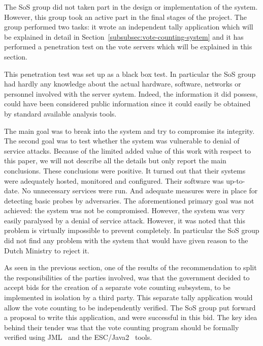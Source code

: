 \documentclass[times, 10pt, twocolumn]{article}
\begin{document}
The SoS group did not taken part in the design or implementation of the system. 
However, this group took an active part in the final stages of the project. The 
group performed two tasks: it wrote an independent tally application which will 
be explained in detail in Section~\ref{subsubsec:vote-counting-system} and it 
has performed a penetration test on the vote servers which will be explained in 
this section.

This penetration test was set up as a black box test.  In particular
the SoS group had hardly any knowledge about the actual hardware,
software, networks or personnel involved with the server system.  
Indeed, the information it did possess, could have been considered public
information since it could easily be obtained by standard available analysis
tools.

The main goal was to break into the system and try to compromise its integrity. 
The second goal was to test whether the system was vulnerable to denial of 
service attacks.  Because of the limited added value of this work with respect 
to this paper, we will not describe all the details but only report the main 
conclusions.  These conclusions were positive. It turned out that their systems 
were adequately hosted, monitored and configured.  Their software was 
up-to-date.  No unnecessary services were run.  And adequate measures were in 
place for detecting basic probes by adversaries.  The aforementioned primary goal 
was not achieved: the system was not be compromised.  However, the system was 
very easily paralysed by a denial of service attack.  However, it was noted that 
this problem is virtually impossible to prevent completely.  In particular the SoS 
group did not find any problem with the system that would have given reason to
the Dutch Ministry to reject it.

\label{subsubsec:vote-counting-system}

As seen in the previous section, one of the results
of the recommendation to split the responsibilities of the parties involved, was that
the government decided to accept bids for 
the creation of a separate vote counting subsystem, to be implemented in 
isolation by a third party. This separate tally application would allow the 
vote counting to be independently verified. The SoS group put forward a 
proposal to write this application, and were successful in this bid. The key 
idea behind their tender was that the vote counting program should be formally 
verified using JML~\cite{BurdyEtal05-STTT} and the ESC/Java2~\cite{KiniryCok04} 
tools.
\end{document}
